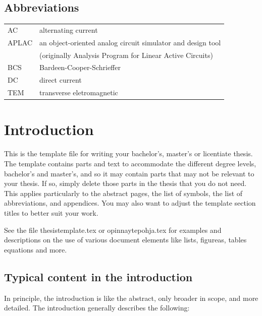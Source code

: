 \documentclass[english, 12pt, a4paper, elec, utf8, a-2b, online]{aaltothesis}
\begin{document}
\subsection*{Abbreviations}

\begin{tabular}{ll}
AC         & alternating current \\
APLAC      & an object-oriented analog circuit simulator and design tool \\
           & (originally Analysis Program for Linear Active Circuits) \\
BCS        & Bardeen-Cooper-Schrieffer \\ %
DC         & direct current \\
TEM        & transverse eletromagnetic
\end{tabular}


\cleardoublepage

\section{Introduction}
\label{sec:intro}

\thispagestyle{empty}

This is the template file for writing your bachelor’s, master’s or licentiate 
thesis. The template contains parts and text to accommodate the different degree 
levels, bachelor’s and master’s, and so it may contain parts that may not be 
relevant to your thesis. If so, simply delete those parts in the thesis that you
do not need. This applies particularly to the abstract pages, the list of
symbols, the list of abbreviations, and appendices. You may also want to adjust
the template section titles to better suit your work.

See the file thesistemplate.tex or opinnaytepohja.tex for examples and 
descriptions on the use of various document elements like lists, figureas, 
tables equations and more. 

\subsection{Typical content in the introduction}

In principle, the introduction is like the abstract, only broader in scope, and
more detailed. The introduction generally describes the following:
\end{document}
